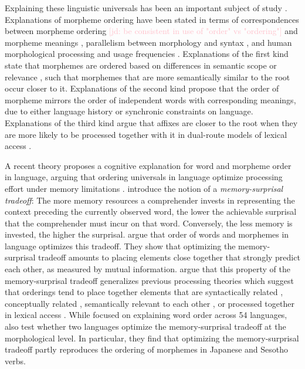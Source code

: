 \documentclass[11pt,letterpaper]{article}
\newcommand{\citep}{\parencite}
\newcommand{\citet}{\Textcite}
\newcommand{\jd}[1]{\textcolor{Pink}{[jd: #1]}}
\begin{document}
Explaining these linguistic universals has been an important subject of study \citep{bybee-morphology-1985, spencer2006linguistic, manova2010modeling, bauer2010an, rice2011principles,hay2004what}.
Explanations of morpheme ordering have been stated in terms of correspondences between morpheme ordering \jd{be consistent in use of "order" vs "ordering"} and morpheme meanings \citep{bybee-morphology-1985,rice2000morpheme,saldana2021cross}, parallelism between morphology and syntax \citep{givon1971historical,venneman1973explanation,baker1985the}, and human morphological processing and usage frequencies \citep{hay2002speech, plag2002the, inkelas2016affix}.
Explanations of the first kind state that morphemes are ordered based on differences in semantic scope \citep{rice2000morpheme} or relevance \citep{bybee-morphology-1985}, such that morphemes that are more semantically similar to the root occur closer to it.
Explanations of the second kind propose that the order of morpheme mirrors the order of independent words with corresponding meanings, due to either language history or synchronic constraints on language.
Explanations of the third kind argue that affixes are closer to the root when they are more likely to be processed together with it in dual-route models of lexical access \citep{baayen-frequency-1993}.

A recent theory proposes a cognitive explanation for word and morpheme order in language, arguing that ordering universals in language optimize processing effort under memory limitations \citep{Hahn2020modeling}.
\citet{Hahn2020modeling} introduce the notion of a \emph{memory-surprisal tradeoff}: The more memory resources a comprehender invests in representing the context preceding the currently observed word, the lower the achievable surprisal that the comprehender must incur on that word. Conversely, the less memory is invested, the higher the surprisal.
\citet{Hahn2020modeling} argue that order of words and morphemes in language optimizes this tradeoff.
They show that optimizing the memory-surprisal tradeoff amounts to placing elements close together that strongly predict each other, as measured by mutual information.
\citet{Hahn2020modeling} argue that this property of the memory-surprisal tradeoff generalizes previous processing theories which suggest that orderings tend to place together elements that are syntactically related \citep{rijkhoff-word-1986, hawkins-performance-1994}, conceptually related \citep{givon1985iconicity}, semantically relevant to each other \citep{bybee-morphology-1985}, or processed together in lexical access \citep{hay2004what}.
While focused on explaining word order across 54 languages, \citet{Hahn2020modeling} also test whether two languages optimize the memory-surprisal tradeoff at the morphological level. In particular, they find that optimizing the memory-surprisal tradeoff partly reproduces the ordering of morphemes in Japanese and Sesotho verbs.
\end{document}
